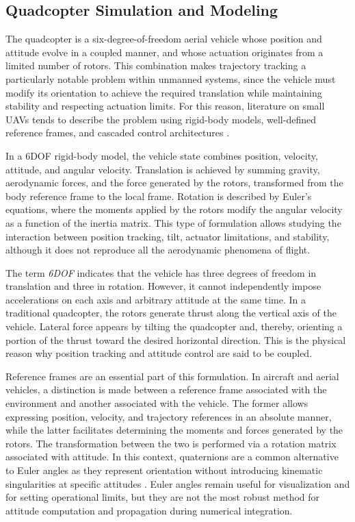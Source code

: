 \subsection{Quadcopter Simulation and Modeling}

The quadcopter is a six-degree-of-freedom aerial vehicle whose position and attitude evolve in a coupled manner, and whose actuation originates from a limited number of rotors. This combination makes trajectory tracking a particularly notable problem within unmanned systems, since the vehicle must modify its orientation to achieve the required translation while maintaining stability and respecting actuation limits. For this reason, literature on small UAVs tends to describe the problem using rigid-body models, well-defined reference frames, and cascaded control architectures \cite{beard2012small,mellinger2011minimum,lee2010geometric}.

In a 6DOF rigid-body model, the vehicle state combines position, velocity, attitude, and angular velocity. Translation is achieved by summing gravity, aerodynamic forces, and the force generated by the rotors, transformed from the body reference frame to the local frame. Rotation is described by Euler's equations, where the moments applied by the rotors modify the angular velocity as a function of the inertia matrix. This type of formulation allows studying the interaction between position tracking, tilt, actuator limitations, and stability, although it does not reproduce all the aerodynamic phenomena of flight.

The term \textit{6DOF} indicates that the vehicle has three degrees of freedom in translation and three in rotation. However, it cannot independently impose accelerations on each axis and arbitrary attitude at the same time. In a traditional quadcopter, the rotors generate thrust along the vertical axis of the vehicle. Lateral force appears by tilting the quadcopter and, thereby, orienting a portion of the thrust toward the desired horizontal direction. This is the physical reason why position tracking and attitude control are said to be coupled.

Reference frames are an essential part of this formulation. In aircraft and aerial vehicles, a distinction is made between a reference frame associated with the environment and another associated with the vehicle. The former allows expressing position, velocity, and trajectory references in an absolute manner, while the latter facilitates determining the moments and forces generated by the rotors. The transformation between the two is performed via a rotation matrix associated with attitude. In this context, quaternions are a common alternative to Euler angles as they represent orientation without introducing kinematic singularities at specific attitudes \cite{kuipers1999quaternions}. Euler angles remain useful for visualization and for setting operational limits, but they are not the most robust method for attitude computation and propagation during numerical integration.

